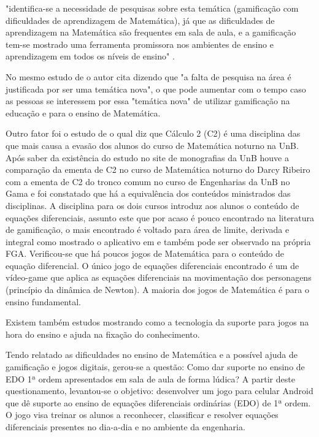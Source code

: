 \begin{citacao}"identifica-se a necessidade de pesquisas sobre esta temática (gamificação com dificuldades de aprendizagem de Matemática), já que as dificuldades de aprendizagem na Matemática são frequentes em sala de aula, e a gamificação tem-se mostrado uma ferramenta promissora nos ambientes de ensino e aprendizagem em todos os níveis de ensino" \cite{revbibmatgam}. \end{citacao}

No mesmo estudo de \cite{revbibmatgam} o autor cita \cite{dicheva} dizendo que "a falta de pesquisa na área é justificada por ser uma temática nova", o que pode aumentar com o tempo caso as pessoas se interessem por essa "temática nova" de utilizar gamificação na educação e para o ensino de Matemática.


Outro fator foi o estudo de \cite{evasaoC2} o qual diz que Cálculo 2 (C2) é uma disciplina das que mais causa a evasão dos alunos do curso de Matemática noturno na UnB. Após saber da existência do estudo no site de monografias da UnB houve a comparação da ementa de C2 no curso de Matemática noturno do Darcy Ribeiro com a ementa de C2 do tronco comum no curso de Engenharias da UnB no Gama e foi constatado que há a equivalência dos conteúdos ministrados das disciplinas. A disciplina para os dois cursos introduz aos alunos o conteúdo de equações diferenciais, assunto este que por acaso é pouco encontrado na literatura de gamificação, o mais encontrado é voltado para área de limite, derivada e integral como mostrado o aplicativo em \cite{appcalculo} e também pode ser observado na própria FGA. Verificou-se que há poucos jogos de Matemática para o conteúdo de equação diferencial. O único jogo de equações diferenciais encontrado é um de vídeo-game que aplica as equações diferenciais na movimentação dos personagens (princípio da dinâmica de Newton)\cite{videoGameED}. A maioria dos jogos de Matemática é para o ensino fundamental.

Existem também estudos mostrando como a tecnologia da suporte para jogos na hora do ensino e ajuda na fixação do conhecimento. 

Tendo relatado as dificuldades no ensino de Matemática e a possível ajuda de gamificação e jogos digitais, gerou-se a questão: Como dar suporte no ensino de EDO 1ª ordem apresentados em sala de aula de forma lúdica? A partir deste questionamento, levantou-se o objetivo: desenvolver um jogo para celular Android que dê suporte ao ensino de equações diferenciais ordinárias (EDO) de 1ª ordem. O jogo visa treinar os alunos a reconhecer, classificar e resolver equações diferenciais presentes no dia-a-dia e no ambiente da engenharia.

